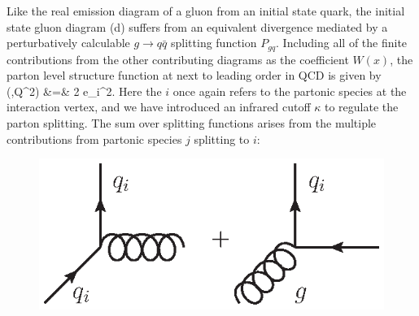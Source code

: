 Like the real emission diagram of a gluon from an initial state quark, the initial state gluon diagram (d) suffers from an equivalent divergence mediated by a perturbatively calculable $g\to q\bar{q}$ splitting function $P_{gq}$. Including all of the finite contributions from the other contributing diagrams as the coefficient $W(x)$, the parton level structure function at next to leading order in QCD is given by
\ba
 (\xi,Q^2) &=& 2 e_i^2. \label{eq:f2plnlo}
\ea
Here the $i$ once again refers to the partonic species at the interaction vertex, and we have introduced an infrared cutoff $\kappa$ to regulate the parton splitting. The sum over splitting functions arises from the multiple contributions from partonic species $j$ splitting to $i$:
\begin{figure}[ht]
\centering
\includegraphics[scale=0.6]{2-PDFs/figs/qgq.eps}
\end{figure}

